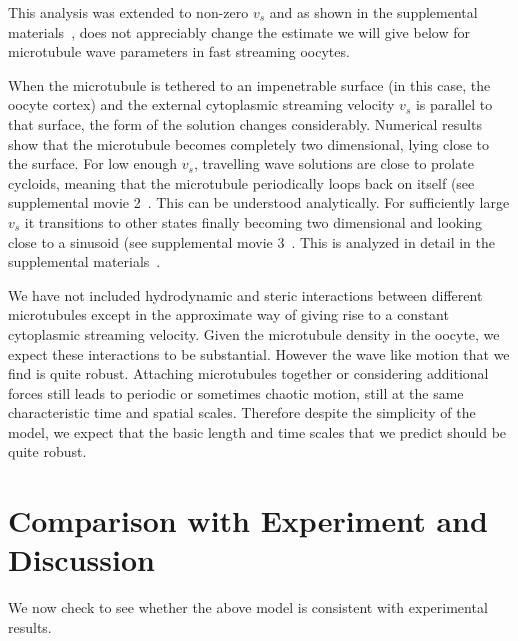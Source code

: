 \documentclass[pre,showpacs]{revtex4}
\begin{document}
This analysis was extended to non-zero $v_s$ and as shown in the supplemental materials~\cite{SupplMat}, does not
appreciably change the estimate we will give below for microtubule wave parameters in fast streaming oocytes. 


When the microtubule is tethered to an impenetrable surface (in this case, the oocyte cortex) and the external cytoplasmic streaming velocity $v_s$
is parallel to that surface, the form of the solution changes considerably. Numerical results show that the microtubule becomes completely two dimensional,
lying close to the surface. For low enough $v_s$, travelling wave
solutions are close to prolate cycloids, meaning that the microtubule periodically loops back
on itself (see supplemental movie 2~\cite{SupplMovies}. This can be understood analytically. For sufficiently large $v_s$ it transitions to other states finally becoming 
two dimensional and looking close to a sinusoid (see supplemental movie 3~\cite{SupplMovies}. This is analyzed in detail in
the supplemental materials~\cite{SupplMat}.

We have not included hydrodynamic and steric interactions between
different microtubules except in the approximate way of giving rise to
a constant cytoplasmic streaming velocity. Given the microtubule density in the
oocyte, we expect these interactions to be substantial. However the wave
like motion that we find is quite robust. Attaching microtubules together or
considering additional forces still leads to periodic or sometimes chaotic
motion, still at the same characteristic time and spatial scales. Therefore
despite the simplicity of the model, we expect that the basic length
and time scales that we predict should be quite robust.

\section{Comparison with Experiment and Discussion}

We now check to see whether the above model is consistent with experimental
results.  
\end{document}
